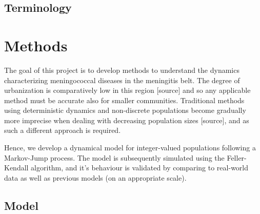 \documentclass[10pt,a4paper]{article}
\begin{document}



\subsection{Terminology}

\section{Methods}

The goal of this project is to develop methods to understand the dynamics characterizing meningococcal diseases in the meningitis belt. The degree of urbanization is comparatively low in this region [source] and so any applicable method must be accurate also for smaller communities. Traditional methods using deterministic dynamics and non-discrete populations become gradually more imprecise when dealing with decreasing population sizes [source], and as such a different approach is required.

Hence, we develop a dynamical model for integer-valued populations following a Markov-Jump process. The model is subsequently simulated using the Feller-Kendall algorithm, and it's behaviour is validated by comparing to real-world data as well as previous models (on an appropriate scale).


\subsection{Model}

\end{document}
